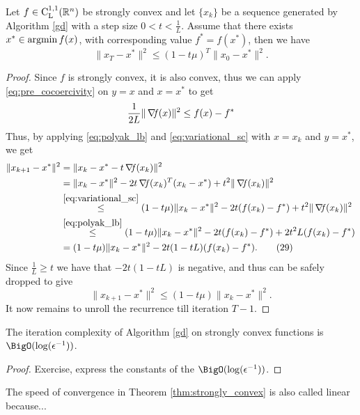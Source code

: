 \documentclass[10pt,a4paper]{article}
\begin{document}
\begin{theorem}\label{thm:strongly_convex}
	Let $f\in \mathord{\mathrm{C^{1,1}_{L}}}(\mathbb{R}^n)$ be strongly convex and let $\{x_k\}$ be a sequence generated by Algorithm \ref{gd} with a step size $0<t<\frac{1}{L}$. Assume that there exists $x^*\in \operatorname*{argmin} f(x)$, with corresponding value $f^*=f(x^*)$, then we have 
	\begin{equation}\label{eq:strongly_convex_convergence}
		\|x_T - x^*\|^2 \leq (1 - t\mu)^T\|x_0 - x^*\|^2.
	\end{equation}
\end{theorem}
\begin{proof}
	Since $f$ is strongly convex, it is also convex, thus we can apply \eqref{eq:pre_cocoercivity} on $y=x$ and $x=x^*$ to get
	\begin{equation}\label{eq:polyak_lb}
		\frac{1}{2L}\|\operatorname*{\mathit{\nabla \!f}}(x) \|^2 \leq f(x)-f^*
	\end{equation}
Thus, by applying \eqref{eq:polyak_lb} and \eqref{eq:variational_sc} with $x=x_k$ and $y=x^*$, we get 
\begin{align*}
	\|x_{k+1} - x^*\|^2 &= \|x_k - x^* - t\operatorname*{\mathit{\nabla \!f}}(x_k)\|^2\\
	&= \|x_k - x^*\|^2 - 2t \operatorname*{\mathit{\nabla \!f}}(x_k)^T (x_k - x^*) + t^2\|\operatorname*{\mathit{\nabla \!f}}(x_k)\|^2\\
	&\stackrel{\eqref{eq:variational_sc}}{\leq} (1-t\mu)\|x_k - x^*\|^2 - 2t(f(x_k) - f^*) + t^2\|\operatorname*{\mathit{\nabla \!f}}(x_k)\|^2\\
	&\stackrel{\eqref{eq:polyak_lb}}{\leq} (1-t\mu)\|x_k - x^*\|^2 - 2t(f(x_k) - f^*) + 2t^2 L(f(x_k) - f^*)\\
	&= (1-t\mu)\|x_k - x^*\|^2 - 2t(1 - t L)(f(x_k) - f^*). \tag{29}
\end{align*}
Since $\frac{1}{L} \geq t$ we have that $-2t(1 - t L)$ is negative, and thus can be safely dropped to give
\begin{equation*}
	\|x_{k+1} - x^*\|^2 \leq (1 - t\mu)\|x_k - x^*\|^2.
\end{equation*}
It now remains to unroll the recurrence till iteration $T-1$.
\end{proof}
\begin{corollary}
The iteration complexity of Algorithm \eqref{gd} on strongly convex functions is $\BigO(\log(\epsilon^{-1}))$.
\end{corollary}
\begin{proof}
Exercise, express the constants of the $\BigO(\log(\epsilon^{-1}))$.
\end{proof}
\begin{remark}
	The speed of convergence in Theorem \ref{thm:strongly_convex} is also called linear because... 
\end{remark}
\end{document}
